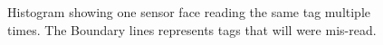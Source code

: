 \begin{figure}[h]
	
	\caption{Histogram showing one sensor face reading the same tag multiple times. The Boundary lines represents tags that will were mis-read.}
	\label{fig:histogram}
\end{figure}


%	
